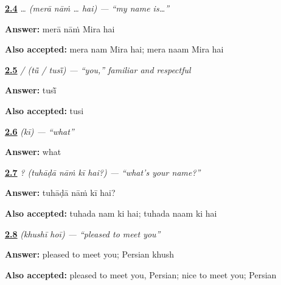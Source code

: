 \noindent\begin{minipage}[t]{\linewidth}
\raggedright
\hyperlink{review-PA-C02-mera-naam-hai-speaking}{\textbf{2.4}} \emph{  …  (merā nāṁ … hai) — \textquotedblleft{}my name is…\textquotedblright{}}\par
\small \textbf{Answer:} merā nāṁ Mira hai\par
\footnotesize \textbf{Also accepted:} mera nam Mira hai; mera naam Mira hai
\end{minipage}\par\medskip

\noindent\begin{minipage}[t]{\linewidth}
\raggedright
\hyperlink{review-PA-C02-tu-tusi-register}{\textbf{2.5}} \emph{ /  (tū̃ / tusī̃) — \textquotedblleft{}you,\textquotedblright{} familiar and respectful}\par
\small \textbf{Answer:} tusī̃\par
\footnotesize \textbf{Also accepted:} tusi
\end{minipage}\par\medskip

\noindent\begin{minipage}[t]{\linewidth}
\raggedright
\hyperlink{review-PA-C02-ki-meaning}{\textbf{2.6}} \emph{ (kī) — \textquotedblleft{}what\textquotedblright{}}\par
\small \textbf{Answer:} what\par
\end{minipage}\par\medskip

\noindent\begin{minipage}[t]{\linewidth}
\raggedright
\hyperlink{review-PA-C02-tuhada-naam-ki-hai-respectful-question}{\textbf{2.7}} \emph{   ? (tuhāḍā nāṁ kī hai?) — \textquotedblleft{}what's your name?\textquotedblright{}}\par
\small \textbf{Answer:} tuhāḍā nāṁ kī hai?\par
\footnotesize \textbf{Also accepted:} tuhada nam ki hai; tuhada naam ki hai
\end{minipage}\par\medskip

\noindent\begin{minipage}[t]{\linewidth}
\raggedright
\hyperlink{review-PA-C02-khushi-meaning}{\textbf{2.8}} \emph{  (khushī hoī) — \textquotedblleft{}pleased to meet you\textquotedblright{}}\par
\small \textbf{Answer:} pleased to meet you; Persian khush\par
\footnotesize \textbf{Also accepted:} pleased to meet you, Persian; nice to meet you; Persian
\end{minipage}\par\medskip

